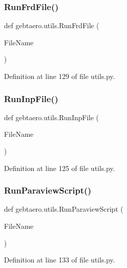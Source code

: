 \subsubsection{\texorpdfstring{Run\+Frd\+File()}{RunFrdFile()}}
{\footnotesize\ttfamily def gebtaero.\+utils.\+Run\+Frd\+File (\begin{DoxyParamCaption}\item[{}]{File\+Name }\end{DoxyParamCaption})}



Definition at line 129 of file utils.\+py.

\mbox{\label{namespacegebtaero_1_1utils_a74be96ae0691643c4e6c459e14360464}} 
\subsubsection{\texorpdfstring{Run\+Inp\+File()}{RunInpFile()}}
{\footnotesize\ttfamily def gebtaero.\+utils.\+Run\+Inp\+File (\begin{DoxyParamCaption}\item[{}]{File\+Name }\end{DoxyParamCaption})}



Definition at line 125 of file utils.\+py.

\mbox{\label{namespacegebtaero_1_1utils_a248e0abbec4c02bcb7e75fea0f400c25}} 
\subsubsection{\texorpdfstring{Run\+Paraview\+Script()}{RunParaviewScript()}}
{\footnotesize\ttfamily def gebtaero.\+utils.\+Run\+Paraview\+Script (\begin{DoxyParamCaption}\item[{}]{File\+Name }\end{DoxyParamCaption})}



Definition at line 133 of file utils.\+py.

\mbox{\label{namespacegebtaero_1_1utils_a48c61ad40665ab0b9a682e5bd06f8702}} 
